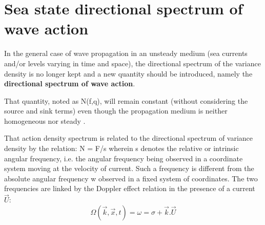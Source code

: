 \section{ Sea state directional spectrum of wave action}
\label{se:seastate}
 In the general case of wave propagation in an unsteady medium (sea currents and/or levels varying in time and space), the directional spectrum of the variance density is no longer kept and a new quantity should be introduced, namely the \textbf{directional spectrum of wave action}.

 That quantity, noted as N(f,q), will remain constant (without considering the source and sink terms) even though the propagation medium is neither homogeneous nor steady \cite{Komen1994} \cite{Willebrand1975} \cite{Phillips1977} \cite{Bretherton1969}.

 That action density spectrum is related to the directional spectrum of variance density by the relation:
\bequ
 \label{GrindEQ__2_15_}
N = F/s
\eequ
 wherein s denotes the relative or intrinsic angular frequency, i.e. the angular frequency being observed in a coordinate system moving at the velocity of current. Such a frequency is different from the absolute angular frequency w observed in a fixed system of coordinates. The two frequencies are linked by the Doppler effect relation in the presence of a current $\vec{U}$:
\begin{equation} \label{GrindEQ__2_16_}
\Omega (\vec{k},\vec{x},t)=\omega =\sigma +\vec{k}.\vec{U}
\end{equation}


